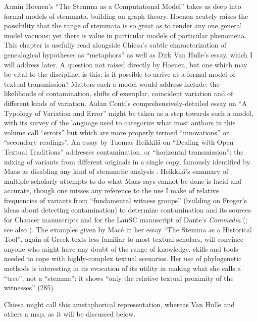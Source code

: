 \documentclass{article}
\begin{document}
Armin Hoenen's ``The Stemma as a Computational Model'' takes us
deep into formal models of stemmata, building on graph theory. Hoenen
acutely raises the possibility that the range of stemmata is so great as
to render any one general model vacuous; yet there is value in
particular models of particular phenomena. This chapter is usefully read
alongside Chiesa's subtle characterization of genealogical hypotheses as
``metaphors'' as well as Dirk Van Hulle's essay, which I will address
later. A question not raised directly by Hoenen, but one which may be
vital to the discipline, is this: is it possible to arrive at a formal
model of textual transmission? Matters such a model would address
include: the likelihoods of contamination, shifts of exemplar,
coincident variation and of different kinds of variation. Aidan Conti's
comprehensively-detailed essay on ``A Typology of Variation and Error''
might be taken as a step towards such a model, with its survey of the
language used to categorize what most authors in this volume call
``errors'' but which are more properly termed ``innovations'' or
``secondary readings''. An essay by Tuomas Heikkilä on ``Dealing with
Open Textual Traditions'' addresses contamination, or ``horizontal
transmission'': the mixing of variants from different originals in a
single copy, famously identified by Maas as disabling any kind of
stemmatic analysis \parencite{maas_textual_1958}. Heikkilä's summary of multiple scholarly
attempts to do what Maas says cannot be done is lucid and accurate,
though one misses any reference to the use I make of relative
frequencies of variants from ``fundamental witness groups'' (building on
Froger's ideas about detecting contamination) to determine contamination
and its sources for Chaucer manuscripts and for the LauSC manuscript of
Dante's \emph{Commedia} (\cite{robinson_stemmatic_1997}; see also \cite{robinson_l0_2021}). The examples given by Macé in her essay ``The Stemma as a
Historical Tool'', again of Greek texts less familiar to most textual
scholars, will convince anyone who might have any doubt of the range of
knowledge, skills and tools needed to cope with highly-complex textual
scenarios. Her use of phylogenetic methods is interesting in its
evocation of its utility in making what she calls a ``tree'', not a
``stemma'': it shows ``only the relative textual proximity of the
witnesses'' (285). 

\newpage

\noindent Chiesa might call this ametaphorical representation,
whereas Van Hulle and others a map, as it will be discussed below.
\end{document}
